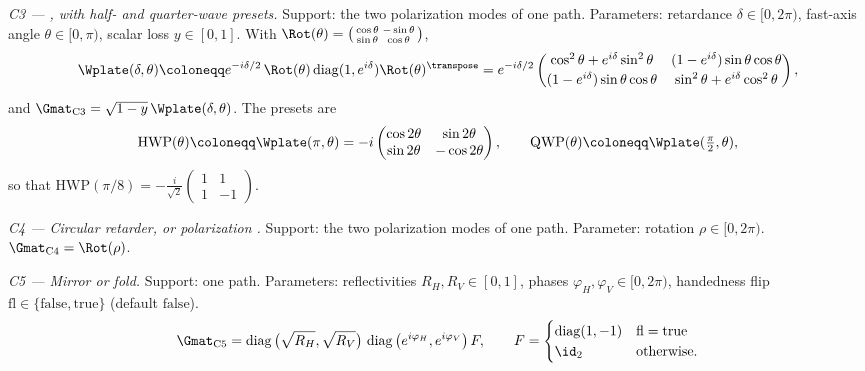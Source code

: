 \begin{definition}
\emph{C3 --- , with half- and quarter-wave presets.} Support: the two
polarization modes of one path. Parameters: retardance $\delta\in[0,2\pi)$,
fast-axis angle $\theta\in[0,\pi)$, scalar loss $y\in[0,1]$. With
$\Rot(\theta)=\left(\begin{smallmatrix}\cos\theta&-\sin\theta\\
\sin\theta&\cos\theta\end{smallmatrix}\right)$,
\begin{equation}\label{eq:retarder}
  \Wplate(\delta,\theta)
  \coloneqq e^{-i\delta/2}\,\Rot(\theta)\operatorname{diag}(1,e^{i\delta})
    \Rot(\theta)^{\transpose}
  = e^{-i\delta/2}
  \begin{pmatrix}
    \cos^2\theta+e^{i\delta}\sin^2\theta &
    (1-e^{i\delta})\sin\theta\cos\theta\\[2pt]
    (1-e^{i\delta})\sin\theta\cos\theta &
    \sin^2\theta+e^{i\delta}\cos^2\theta
  \end{pmatrix},
\end{equation}
and $\Gmat_{\mathrm{C3}}=\sqrt{1-y}\,\Wplate(\delta,\theta)$.
The presets are
\begin{equation}\label{eq:hwpqwp}
  \mathrm{HWP}(\theta)\coloneqq\Wplate(\pi,\theta)
  =-i\begin{pmatrix}\cos2\theta&\sin2\theta\\
                    \sin2\theta&-\cos2\theta\end{pmatrix},
  \qquad
  \mathrm{QWP}(\theta)\coloneqq\Wplate(\tfrac{\pi}{2},\theta),
\end{equation}
so that $\mathrm{HWP}(\pi/8)=-\tfrac{i}{\sqrt2}
\left(\begin{smallmatrix}1&1\\1&-1\end{smallmatrix}\right)$.

\emph{C4 --- Circular retarder, or polarization .} Support: the two
polarization modes of one path. Parameter: rotation $\rho\in[0,2\pi)$.
$\Gmat_{\mathrm{C4}}=\Rot(\rho)$.

\emph{C5 --- Mirror or fold.} Support: one path. Parameters: reflectivities
$R_H,R_V\in[0,1]$, phases $\varphi_H,\varphi_V\in[0,2\pi)$, handedness flip
$\mathrm{fl}\in\{\mathrm{false},\mathrm{true}\}$ (default $\mathrm{false}$).
\begin{equation}\label{eq:mirror}
  \Gmat_{\mathrm{C5}}=\operatorname{diag}\big(\sqrt{R_H},\sqrt{R_V}\big)\,
  \operatorname{diag}\big(e^{i\varphi_H},e^{i\varphi_V}\big)\,
  F,\qquad
  F=\begin{cases}\operatorname{diag}(1,-1)&\mathrm{fl}=\mathrm{true}\\
                 \id_2&\text{otherwise.}\end{cases}
\end{equation}


\end{definition}
